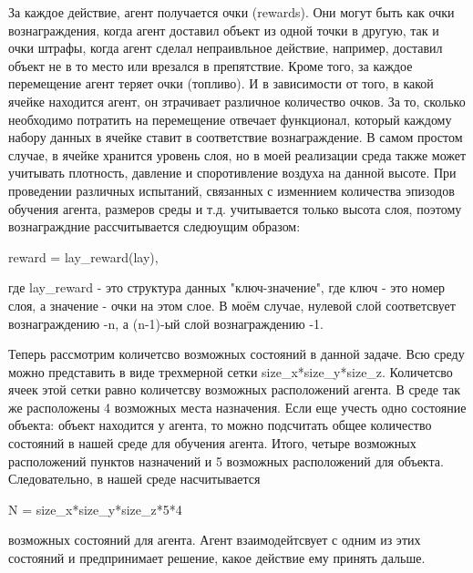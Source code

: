 \documentclass[12pt, a4paper]{report}
\theoremstyle{definition}
\theoremstyle{plain}
\theoremstyle{remark}
\theoremstyle{remark}
\theoremstyle{definition}
\begin{document}
За каждое действие, агент получается очки (rewards). Они могут быть как очки вознаграждения, когда агент доставил объект из одной точки в другую, так и очки штрафы, когда агент сделал непраивльное действие, например, доставил объект не в то место или врезался в препятствие. Кроме того, за каждое перемещение агент теряет очки (топливо). И в зависимости от того, в какой ячейке находится агент, он зтрачивает различное количество очков. За то, сколько необходимо потратить на перемещение отвечает функционал, который каждому набору данных в ячейке ставит в соответствие вознаграждение. В самом простом случае, в ячейке хранится уровень слоя, но в моей реализации среда также может учитывать плотность, давление и споротивление воздуха на данной высоте. При проведении различных испытаний, связанных с изменнием количества эпизодов обучения агента, размеров среды и т.д. учитывается только высота слоя, поэтому вознаграждние рассчитывается следюущим образом:
\begin{center}
    reward = lay\_reward(lay),
\end{center}
где lay\_reward - это структура данных "ключ-значение", где ключ - это номер слоя, а значение - очки на этом слое. В моём случае, нулевой слой соответсвует вознаграждению -n, а (n-1)-ый слой вознаграждению -1. 

Теперь рассмотрим количетсво возможных состояний в данной задаче. Всю среду можно представить в виде трехмерной сетки size\_x*size\_y*size\_z. Количетсво ячеек этой сетки равно количетсву возможных расположений агента. В среде так же расположены 4 возможных места назначения. Если еще учесть одно состояние объекта: объект находится у агента, то можно подсчитать общее количество состояний в нашей среде для обучения агента. Итого, четыре возможных расположений пунктов назначений и 5 возможных расположений для объекта. Следовательно, в нашей среде насчитывается 
\begin{center}
    N = size\_x*size\_y*size\_z*5*4
\end{center}
возможных состояний для агента. Агент взаимодейтсвует с одним из этих состояний и предпринимает решение, какое действие ему принять дальше.\\
\end{document}
